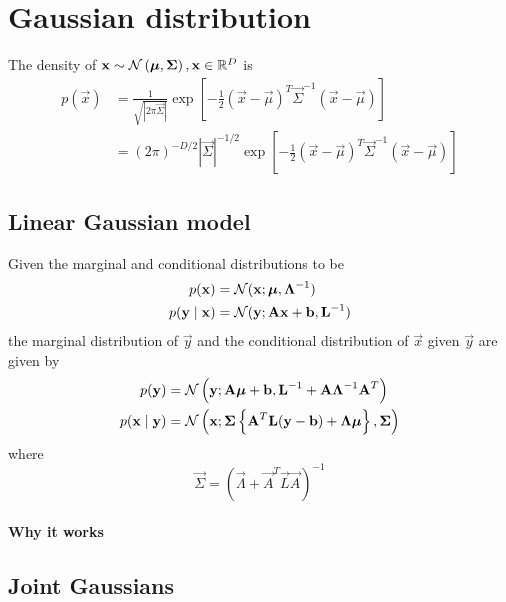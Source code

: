 \section{Gaussian distribution}
\label{sec:basics/gaussian}
The density of $\boldsymbol{\mathbf{x}} \sim \operatorname{\mathcal N}\left(\boldsymbol{\mathbf{\mu}}, \boldsymbol{\mathbf{\Sigma}}\right), \boldsymbol{\mathbf{x}} \in \mathbb R^D$ is
\begin{align}
    p(\vec x)   &= \frac{1}{\sqrt{|2\pi\vec \Sigma|}} \exp{\left[-\frac{1}{2}(\vec x - \vec \mu)^T \vec \Sigma^{-1} (\vec x - \vec \mu)\right]} \\
                &= (2\pi)^{-D / 2} |\vec \Sigma|^{-1 / 2} \exp{\left[-\frac{1}{2}(\vec x - \vec \mu)^T \vec \Sigma^{-1} (\vec x - \vec \mu)\right]}
\end{align}
\subsection{Linear Gaussian model}
\label{ssec:basics/gaussian/lin}
Given the marginal and conditional distributions to be
\begin{align}
    p(\boldsymbol{\mathbf{x}})               &= \operatorname{\mathcal N}(\boldsymbol{\mathbf{x}}; \boldsymbol{\mathbf{\mu}}, \boldsymbol{\mathbf{\Lambda}}^{-1}) \label{eqn:prob-gaussian-lingauss1} \\
    p(\boldsymbol{\mathbf{y}} \mid \boldsymbol{\mathbf{x}})   &= \operatorname{\mathcal N}(\boldsymbol{\mathbf{y}}; \boldsymbol{\mathbf{A}} \boldsymbol{\mathbf{x}} + \boldsymbol{\mathbf{b}}, \boldsymbol{\mathbf{L}}^{-1}) \label{eqn:prob-gaussian-lingauss2}
\end{align}
the marginal distribution of $\vec y$ and the conditional distribution of $\vec x$ given $\vec y$ are given by
\begin{align}
    p(\boldsymbol{\mathbf{y}})               &= \operatorname{\mathcal N}\left(\boldsymbol{\mathbf{y}}; \boldsymbol{\mathbf{A}} \boldsymbol{\mathbf{\mu}} + \boldsymbol{\mathbf{b}}, \boldsymbol{\mathbf{L}}^{-1} + \boldsymbol{\mathbf{A}} \boldsymbol{\mathbf{\Lambda}}^{-1} \boldsymbol{\mathbf{A}}^T\right) \label{eqn:prob-gaussian-lingauss3}\\
    p(\boldsymbol{\mathbf{x}} \mid \boldsymbol{\mathbf{y}})   &= \operatorname{\mathcal N}\left(\boldsymbol{\mathbf{x}}; \boldsymbol{\mathbf{\Sigma}}\left\{\boldsymbol{\mathbf{A}}^T \boldsymbol{\mathbf{L}}(\boldsymbol{\mathbf{y}} - \boldsymbol{\mathbf{b}}) + \boldsymbol{\mathbf{\Lambda}} \boldsymbol{\mathbf{\mu}}\right\}, \boldsymbol{\mathbf{\Sigma}}\right) \label{eqn:prob-gaussian-lingauss4}
\end{align}
where
\begin{equation}
    \vec \Sigma = \left(\vec \Lambda + \vec A^T \vec L \vec A \right)^{-1} \label{eqn:prob-gaussian-lingauss5}
\end{equation}

\paragraph{Why it works}

\subsection{Joint Gaussians}
\label{ssec:basics/gaussian/joint}